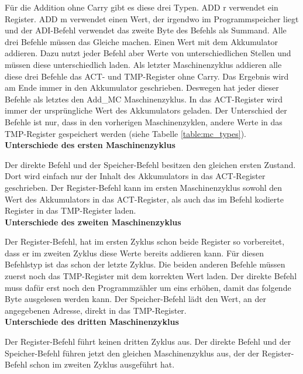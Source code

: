 \documentclass[12pt]{article}
\begin{document}
\noindent
Für die Addition ohne Carry gibt es diese drei Typen. ADD r verwendet ein Register. ADD m verwendet einen Wert, der irgendwo im Programmspeicher liegt und der ADI-Befehl verwendet das zweite Byte des Befehls als Summand. Alle drei Befehle müssen das Gleiche machen. Einen Wert mit dem Akkumulator addieren. Dazu nutzt jeder Befehl aber Werte von unterschiedlichen Stellen und müssen diese unterschiedlich laden. 
Als letzter Maschinenzyklus addieren alle diese drei Befehle das ACT- und TMP-Register ohne Carry. Das Ergebnis wird am Ende immer in den Akkumulator geschrieben. Deswegen hat jeder dieser Befehle als letztes den Add\_MC Maschinenzyklus.
In das ACT-Register wird immer der ursprüngliche Wert des Akkumulators geladen. Der Unterschied der Befehle ist nur, dass in den vorherigen Maschinenzyklen, andere Werte in das TMP-Register gespeichert werden (siehe Tabelle \ref{table:mc_types}).
\\

\noindent
\textbf{Unterschiede des ersten Maschinenzyklus}

\noindent
Der direkte Befehl und der Speicher-Befehl besitzen den gleichen ersten Zustand. Dort wird einfach nur der Inhalt des Akkumulators in das ACT-Register geschrieben.
Der Register-Befehl kann im ersten Maschinenzyklus sowohl den Wert des Akkumulators in das ACT-Register, als auch das im Befehl kodierte Register in das TMP-Register laden.
\\

\noindent
\textbf{Unterschiede des zweiten Maschinenzyklus}

\noindent
Der Register-Befehl, hat im ersten Zyklus schon beide Register so vorbereitet, dass er im zweiten Zyklus diese Werte bereits addieren kann. Für diesen Befehlstyp ist das schon der letzte Zyklus.
Die beiden anderen Befehle müssen zuerst noch das TMP-Register mit dem korrekten Wert laden. Der direkte Befehl muss dafür erst noch den Programmzähler um eins erhöhen, damit das folgende Byte ausgelesen werden kann. Der Speicher-Befehl lädt den Wert, an der angegebenen Adresse, direkt in das TMP-Register.
\\

\noindent
\textbf{Unterschiede des dritten Maschinenzyklus}

\noindent
Der Register-Befehl führt keinen dritten Zyklus aus.
Der direkte Befehl und der Speicher-Befehl führen jetzt den gleichen Maschinenzyklus aus, der der Register-Befehl schon im zweiten Zyklus ausgeführt hat.
\end{document}
